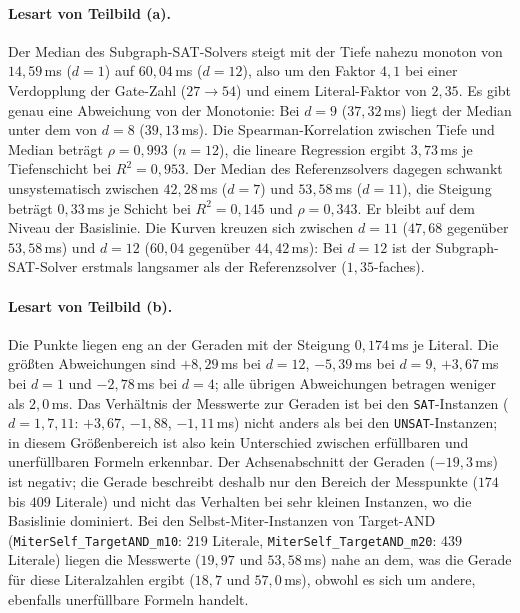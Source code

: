 \documentclass[a4paper,12pt]{article}
\theoremstyle{definition}
\begin{document}
\paragraph{Lesart von Teilbild (a).} Der Median des Subgraph-SAT-Solvers steigt mit der Tiefe nahezu monoton von $14{,}59$\,ms ($d=1$) auf $60{,}04$\,ms ($d=12$), also um den Faktor $4{,}1$ bei einer Verdopplung der Gate-Zahl ($27 \to 54$) und einem Literal-Faktor von $2{,}35$. Es gibt genau eine Abweichung von der Monotonie: Bei $d=9$ ($37{,}32$\,ms) liegt der Median unter dem von $d=8$ ($39{,}13$\,ms). Die Spearman-Korrelation zwischen Tiefe und Median beträgt $\rho = 0{,}993$ ($n=12$), die lineare Regression ergibt $3{,}73$\,ms je Tiefenschicht bei $R^2 = 0{,}953$. Der Median des Referenzsolvers dagegen schwankt unsystematisch zwischen $42{,}28$\,ms ($d=7$) und $53{,}58$\,ms ($d=11$), die Steigung beträgt $0{,}33$\,ms je Schicht bei $R^2 = 0{,}145$ und $\rho = 0{,}343$. Er bleibt auf dem Niveau der Basislinie. Die Kurven kreuzen sich zwischen $d=11$ ($47{,}68$ gegenüber $53{,}58$\,ms) und $d=12$ ($60{,}04$ gegenüber $44{,}42$\,ms): Bei $d=12$ ist der Subgraph-SAT-Solver erstmals langsamer als der Referenzsolver ($1{,}35$-faches).

\paragraph{Lesart von Teilbild (b).} Die Punkte liegen eng an der Geraden mit der Steigung $0{,}174$\,ms je Literal. Die größten Abweichungen sind $+8{,}29$\,ms bei $d=12$, $-5{,}39$\,ms bei $d=9$, $+3{,}67$\,ms bei $d=1$ und $-2{,}78$\,ms bei $d=4$; alle übrigen Abweichungen betragen weniger als $2{,}0$\,ms. Das Verhältnis der Messwerte zur Geraden ist bei den \texttt{SAT}-Instanzen ($d=1,7,11$: $+3{,}67$, $-1{,}88$, $-1{,}11$\,ms) nicht anders als bei den \texttt{UNSAT}-Instanzen; in diesem Größenbereich ist also kein Unterschied zwischen erfüllbaren und unerfüllbaren Formeln erkennbar. Der Achsenabschnitt der Geraden ($-19{,}3$\,ms) ist negativ; die Gerade beschreibt deshalb nur den Bereich der Messpunkte ($174$ bis $409$ Literale) und nicht das Verhalten bei sehr kleinen Instanzen, wo die Basislinie dominiert. Bei den Selbst-Miter-Instanzen von Target-AND (\texttt{MiterSelf\_TargetAND\_m10}: $219$ Literale, \texttt{MiterSelf\_TargetAND\_m20}: $439$ Literale) liegen die Messwerte ($19{,}97$ und $53{,}58$\,ms) nahe an dem, was die Gerade für diese Literalzahlen ergibt ($18{,}7$ und $57{,}0$\,ms), obwohl es sich um andere, ebenfalls unerfüllbare Formeln handelt.
\end{document}
